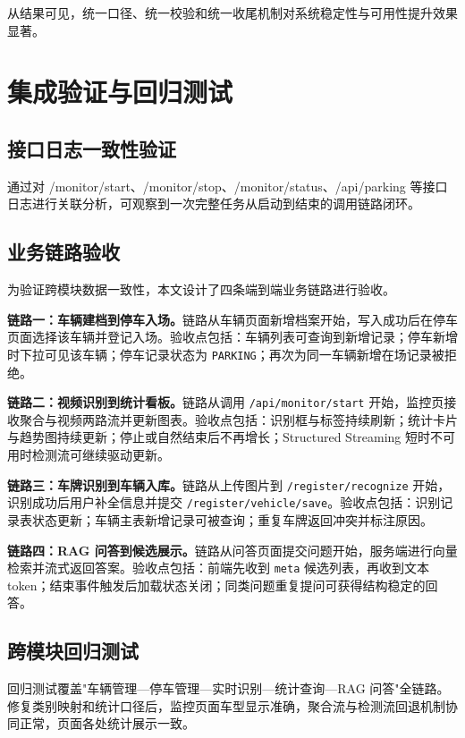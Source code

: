 \documentclass{wzuthesis} %
\begin{document}
从结果可见，统一口径、统一校验和统一收尾机制对系统稳定性与可用性提升效果显著。

\section{集成验证与回归测试}

\subsection{接口日志一致性验证}

通过对 /monitor/start、/monitor/stop、/monitor/status、/api/parking 等接口日志进行关联分析，可观察到一次完整任务从启动到结束的调用链路闭环。

\subsection{业务链路验收}

为验证跨模块数据一致性，本文设计了四条端到端业务链路进行验收。

\textbf{链路一：车辆建档到停车入场。}链路从车辆页面新增档案开始，写入成功后在停车页面选择该车辆并登记入场。验收点包括：车辆列表可查询到新增记录；停车新增时下拉可见该车辆；停车记录状态为 \texttt{PARKING}；再次为同一车辆新增在场记录被拒绝。

\textbf{链路二：视频识别到统计看板。}链路从调用 \nolinkurl{/api/monitor/start} 开始，监控页接收聚合与视频两路流并更新图表。验收点包括：识别框与标签持续刷新；统计卡片与趋势图持续更新；停止或自然结束后不再增长；Structured Streaming 短时不可用时检测流可继续驱动更新。

\textbf{链路三：车牌识别到车辆入库。}链路从上传图片到 \texttt{/register/recognize} 开始，识别成功后用户补全信息并提交 \texttt{/register/vehicle/save}。验收点包括：识别记录表状态更新；车辆主表新增记录可被查询；重复车牌返回冲突并标注原因。

\textbf{链路四：RAG 问答到候选展示。}链路从问答页面提交问题开始，服务端进行向量检索并流式返回答案。验收点包括：前端先收到 \texttt{meta} 候选列表，再收到文本 token；结束事件触发后加载状态关闭；同类问题重复提问可获得结构稳定的回答。

\subsection{跨模块回归测试}

回归测试覆盖"车辆管理—停车管理—实时识别—统计查询—RAG 问答"全链路。修复类别映射和统计口径后，监控页面车型显示准确，聚合流与检测流回退机制协同正常，页面各处统计展示一致。
\end{document}
